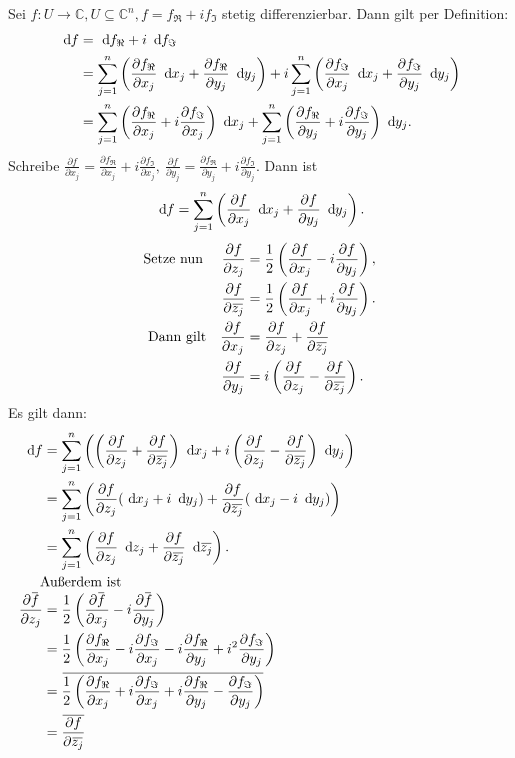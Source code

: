 \documentclass[a4paper,12pt]{book}
\theoremstyle{newthm}
\theoremstyle{newdef}
\theoremstyle{newrem}
\newcommand{\C}{\mathbb{C}}
\renewcommand{\d}{\ \operatorname{d}\hspace{-2px}}
\newcommand{\del}{\partial}
\newcommand{\overbar}[1]{\mkern 1.5mu\overline{\mkern-1.5mu#1\mkern-1.5mu}\mkern 1.5mu}
\begin{document}
		Sei $ f: U \to \C, U \subseteq \C^n, f= f_\Re + if_\Im $ stetig differenzierbar. Dann gilt per Definition:
		\begin{align*}
			\d f &= \d f_\Re + i\d f_\Im\\
			&= \sum_{j=1}^{n} \left( \frac{\del f_\Re}{\del x_j} \d x_j + \frac{\del f_\Re}{\del y_j}\d y_j \right) + i \sum_{j=1}^n \left( \frac{\del f_\Im}{\del x_j} \d x_j + \frac{\del f_\Im}{\del y_j} \d y_j \right)\\
			&= \sum_{j=1}^{n} \left( \frac{\del f_\Re}{\del x_j} + i \frac{\del f_\Im}{\del x_j} \right) \d x_j + \sum_{j=1}^n \left( \frac{\del f_\Re}{\del y_j} + i \frac{\del f_\Im}{\del y_j} \right) \d y_j.
		\end{align*}
		Schreibe $ \frac{\del f}{\del x_j} = \frac{\del f_\Re}{\del x_j} + i\frac{\del f_\Im}{\del x_j},\ \frac{\del f}{\del y_j} = \frac{\del f_\Re}{\del y_j} + i\frac{\del f_\Im}{\del y_j} $. Dann ist 
		\[ \d f = \sum_{j=1}^n \left( \frac{\del f}{\del x_j} \d x_j + \frac{\del f}{\del y_j} \d y_j \right). \]
		\begin{align*}
			\text{Setze nun }\quad \frac{\del f}{\del z_j} &= \frac{1}{2} \left( \frac{\del f}{\del x_j} - i \frac{\del f}{\del y_j} \right),\\
			\frac{\del f}{\del \overbar{z_j}} &= \frac{1}{2} \left( \frac{\del f}{\del x_j} + i \frac{\del f}{\del y_j} \right).\\
			\text{Dann gilt}\quad \frac{\del f}{\del x_j} &= \frac{\del f}{\del z_j} + \frac{\del f}{\del \overbar{z_j}}\\
			\frac{\del f}{\del y_j} &= i \left(\frac{\del f}{\del z_j} - \frac{\del f}{\del \overbar{z_j}}\right).
		\end{align*}
		Es gilt dann:
		\begin{align*}
			\d f &= \sum_{j=1}^{n} \left( \left( \frac{\del f}{\del z_j} + \frac{\del f}{\del \overbar{z_j}} \right) \d x_j + i \left( \frac{\del f}{\del z_j} - \frac{\del f}{\del \overbar{z_j}} \right) \d y_j \right)\\
			&= \sum_{j=1}^n \left( \frac{\del f}{\del z_j} (\d x_j + i\d y_j) + \frac{\del f}{\del \overbar{z_j}} (\d x_j - i\d y_j) \right)\\
			&= \sum_{j=1}^n \left( \frac{\del f}{\del z_j}\d z_j + \frac{\del f}{\del \overbar{z_j}}\d \overbar{z_j} \right).\\
		\noalign{Außerdem ist}
			\frac{\del \overbar{f}}{\del z_j} &= \frac{1}{2} \left( \frac{\del \overbar{f}}{\del x_j} - i\frac{\del \overbar{f}}{\del y_j} \right)\\
			&= \frac{1}{2} \left( \frac{\del f_\Re}{\del x_j} - i\frac{\del f_\Im}{\del x_j} - i\frac{\del f_\Re}{\del y_j} + i^2\frac{\del f_\Im}{\del y_j} \right)\\
			&= \overbar{\frac{1}{2} \left( \frac{\del f_\Re}{\del x_j} + i\frac{\del f_\Im}{\del x_j} + i\frac{\del f_\Re}{\del y_j} - \frac{\del f_\Im}{\del y_j} \right)}\\
			&= \overbar{\frac{\del f}{\del \overbar{z_j}}}
		\end{align*}
\end{document}
